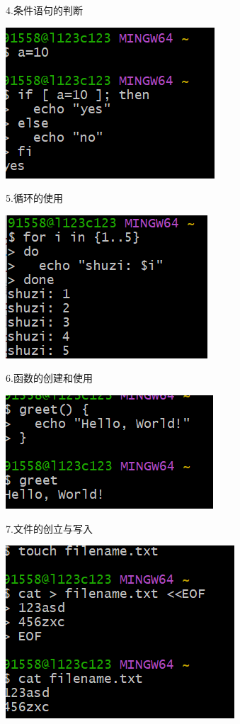 \documentclass{article}
\begin{document}
4.条件语句的判断

\noindent
\begin{minipage}{\linewidth}
  \centering
  \includegraphics[width=0.5\linewidth]{if.png}
  \label{fig:example}
\end{minipage}

5.循环的使用

\noindent
\begin{minipage}{\linewidth}
 \centering
  \includegraphics[width=0.5\linewidth]{for.png}
  \label{fig:example}
\end{minipage}

6.函数的创建和使用

\noindent
\begin{minipage}{\linewidth}
	\centering
	\includegraphics[width=0.5\linewidth]{greet.png}
	\label{fig:example}
\end{minipage}

7.文件的创立与写入

\noindent
\begin{minipage}{\linewidth}
 \centering
  \includegraphics[width=0.5\linewidth]{touch.png}
  \label{fig:example}
\end{minipage}
\end{document}

